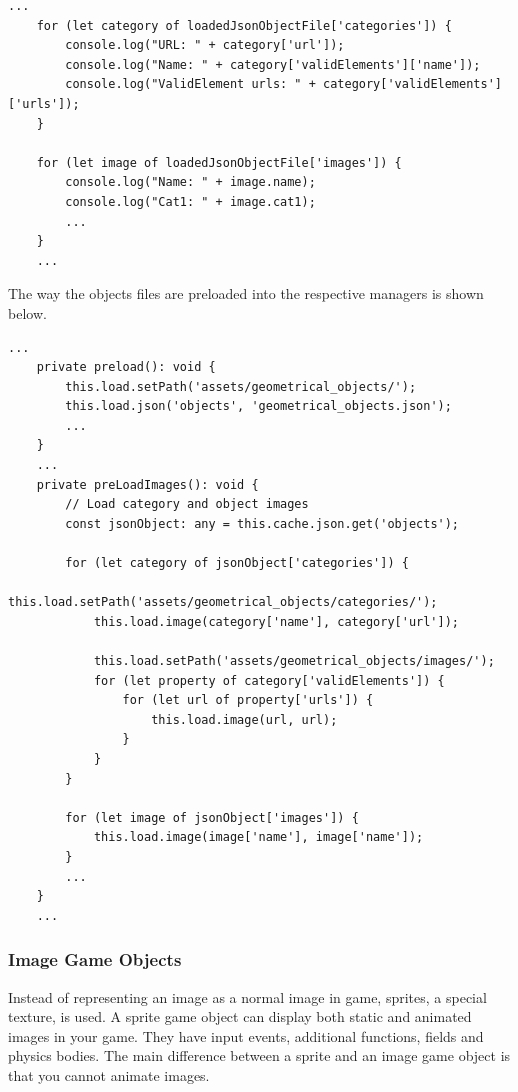 \begin{lstlisting}[style=TypeScript, caption={Example json file access}]
    ...
    for (let category of loadedJsonObjectFile['categories']) {
        console.log("URL: " + category['url']);
        console.log("Name: " + category['validElements']['name']);
        console.log("ValidElement urls: " + category['validElements']['urls']);
    }

    for (let image of loadedJsonObjectFile['images']) {
        console.log("Name: " + image.name);
        console.log("Cat1: " + image.cat1);
        ...
    }
    ...
\end{lstlisting}

The way the objects files are preloaded into the respective managers is shown below.

\begin{lstlisting}[style=TypeScript, caption={preloadAsset.ts}]
    ...
    private preload(): void {
        this.load.setPath('assets/geometrical_objects/');
        this.load.json('objects', 'geometrical_objects.json');
        ...
    }
    ...
    private preLoadImages(): void {
        // Load category and object images
        const jsonObject: any = this.cache.json.get('objects');

        for (let category of jsonObject['categories']) {
            this.load.setPath('assets/geometrical_objects/categories/');
            this.load.image(category['name'], category['url']);

            this.load.setPath('assets/geometrical_objects/images/');
            for (let property of category['validElements']) {
                for (let url of property['urls']) {
                    this.load.image(url, url);
                }
            }
        }

        for (let image of jsonObject['images']) {
            this.load.image(image['name'], image['name']);
        }
        ...
    }
    ...
\end{lstlisting}

\subsubsection{Image Game Objects}
Instead of representing an image as a normal image in game, sprites, a special texture, is used.
A sprite game object can display both static and animated images in your game.
They have input events, additional functions, fields and physics bodies.
The main difference between a sprite and an image game object is that you cannot animate images.

